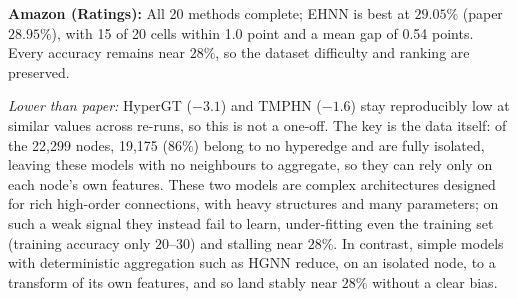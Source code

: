 \documentclass[11pt,a4paper]{article}
\begin{document}
\par\smallskip
\noindent\textbf{Amazon (Ratings):} All 20 methods complete; EHNN is best at $29.05\%$ (paper $28.95\%$), with 15 of 20 cells within 1.0 point and a mean gap of 0.54 points. Every accuracy remains near $28\%$, so the dataset difficulty and ranking are preserved.

\noindent\textit{Lower than paper:} HyperGT ($-3.1$) and TMPHN ($-1.6$) stay reproducibly low at similar values across re-runs, so this is not a one-off. The key is the data itself: of the 22,299 nodes, 19,175 ($86\%$) belong to no hyperedge and are fully isolated, leaving these models with no neighbours to aggregate, so they can rely only on each node's own features. These two models are complex architectures designed for rich high-order connections, with heavy structures and many parameters; on such a weak signal they instead fail to learn, under-fitting even the training set (training accuracy only $20$–$30$) and stalling near $28\%$. In contrast, simple models with deterministic aggregation such as HGNN reduce, on an isolated node, to a transform of its own features, and so land stably near $28\%$ without a clear bias.
\end{document}
